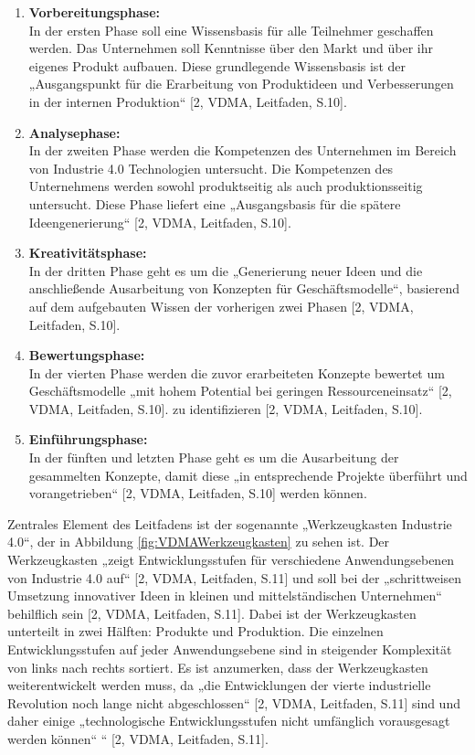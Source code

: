 \begin{enumerate}
	\item \textbf{Vorbereitungsphase:} \\ In der ersten Phase soll eine Wissensbasis für alle Teilnehmer geschaffen werden. Das Unternehmen soll Kenntnisse über den Markt und über ihr eigenes Produkt aufbauen. Diese grundlegende Wissensbasis ist der „Ausgangspunkt für die Erarbeitung von Produktideen und Verbesserungen in der internen Produktion“ [2, VDMA, Leitfaden, S.10].
	\item \textbf{Analysephase:} \\ In der zweiten Phase werden die Kompetenzen des Unternehmen im Bereich von Industrie 4.0 Technologien untersucht. Die Kompetenzen des Unternehmens werden sowohl produktseitig als auch produktionsseitig untersucht. Diese Phase liefert eine „Ausgangsbasis für die spätere Ideengenerierung“ [2, VDMA, Leitfaden, S.10].
	\item \textbf{Kreativitätsphase:} \\ In der dritten Phase geht es um die „Generierung neuer Ideen und die anschließende Ausarbeitung von Konzepten für Geschäftsmodelle“, basierend auf dem aufgebauten Wissen der vorherigen zwei Phasen [2, VDMA, Leitfaden, S.10].
	\item \textbf{Bewertungsphase:} \\ In der vierten Phase werden die zuvor erarbeiteten Konzepte bewertet um Geschäftsmodelle „mit hohem Potential bei geringen Ressourceneinsatz“ [2, VDMA, Leitfaden, S.10].  zu identifizieren [2, VDMA, Leitfaden, S.10].
	\item \textbf{Einführungsphase:} \\ In der fünften und letzten Phase geht es um die Ausarbeitung der gesammelten Konzepte, damit diese „in entsprechende Projekte überführt und vorangetrieben“ [2, VDMA, Leitfaden, S.10] werden können.
\end{enumerate}
Zentrales Element des Leitfadens ist der sogenannte „Werkzeugkasten Industrie 4.0“, der in  Abbildung \ref{fig:VDMAWerkzeugkasten} zu sehen ist. Der Werkzeugkasten „zeigt Entwicklungsstufen für verschiedene Anwendungsebenen von Industrie 4.0 auf“ [2, VDMA, Leitfaden, S.11] und soll bei der „schrittweisen Umsetzung innovativer Ideen in kleinen und mittelständischen Unternehmen“ behilflich sein [2, VDMA, Leitfaden, S.11]. Dabei ist der Werkzeugkasten unterteilt in zwei Hälften: Produkte und Produktion. Die einzelnen Entwicklungsstufen auf jeder Anwendungsebene sind in steigender Komplexität von links nach rechts sortiert. Es ist anzumerken, dass der Werkzeugkasten weiterentwickelt werden muss, da „die Entwicklungen der vierte industrielle Revolution noch lange nicht abgeschlossen“ [2, VDMA, Leitfaden, S.11] sind und daher einige „technologische Entwicklungsstufen nicht umfänglich vorausgesagt werden können“ “ [2, VDMA, Leitfaden, S.11].

